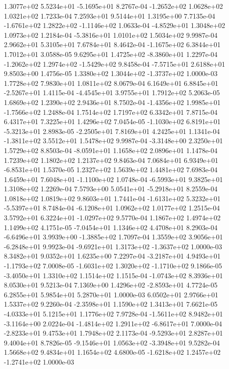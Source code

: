  1.3077e+02  5.5234e+01 -5.1695e+01  8.2767e-04
-1.2652e+02  1.0628e+02  1.0321e+02  1.7233e-04
7.2593e+01 9.5144e+01 1.3195e+00  7.7135e-04
-1.6761e+02  1.2822e+02 -1.1146e+02  1.0633e-04
-4.8529e+01  1.3048e+02  1.0973e+02  1.2184e-04
-5.3816e+01  1.0101e+02  1.5034e+02  9.9987e-04
2.9662e+01 5.3105e+01 7.6784e+01  8.4642e-04
-1.1675e+02  6.3844e+01  1.7012e+01  3.0588e-05
 9.6295e+01  1.4725e+02 -8.3860e+01  1.2297e-04
-1.2062e+02  1.2974e+02 -1.5429e+02  9.8458e-04
-7.5715e+01  2.6188e+01  9.8503e+00  1.4756e-05
 1.3380e+02  1.3044e+02 -1.3737e+02  1.0000e-03
1.7728e+02 7.9830e+01 1.0811e+02  8.0679e-04
 6.1649e+01  6.8845e+01 -2.5267e+01  1.4115e-04
-4.4545e+01  3.9755e+01  1.7912e+02  5.2063e-05
1.6869e+02 1.2390e+02 2.9436e+01  8.7502e-04
-1.4356e+02  1.9985e+01 -1.7566e+02  1.2488e-04
1.7514e+02 1.7197e+02 6.3342e+01  7.8715e-04
6.4317e+01 7.3225e+01 1.4296e+02  7.0454e-05
-1.1030e+02  6.8191e+01 -5.3213e+01  2.8983e-05
-2.2505e+01  7.8169e+01  4.2425e+01  1.1341e-04
-1.3811e+02  3.5512e+01  1.5478e+02  9.9987e-04
-3.3148e+00  2.3250e+01  1.5729e+02  8.8503e-04
-8.0591e+01  1.1658e+02  2.0896e+01  1.1478e-04
1.7239e+02 1.1802e+02 1.2137e+02  9.8463e-04
 7.0684e+01  6.9349e+01 -6.8531e+01  1.5370e-05
1.2327e+02 1.5639e+02 1.4481e+02  7.6983e-04
 1.6459e+01  7.6048e+01 -1.1100e+02  1.0748e-04
-6.5993e+01  9.3825e+01  1.3108e+02  1.2269e-04
 7.5793e+00  5.0541e+01 -5.2918e+01  8.2559e-04
1.0818e+02 1.0819e+02 9.8603e+01  1.7441e-04
-1.6131e+02  5.3232e+01 -5.5397e+01  8.7484e-04
-6.1208e+01  1.0962e+02  1.0177e+02  1.2515e-04
 3.5792e+01  6.3224e+01 -1.0297e+02  9.5770e-04
1.1867e+02 1.4974e+02 1.1499e+02  4.1751e-05
-7.0454e+01  1.1346e+02  4.4708e+01  8.2903e-04
-6.6496e+01  3.9939e+00 -1.3885e+02  1.7097e-04
 1.3559e+02  3.9056e+01 -6.2848e+01  9.9923e-04
-9.6921e+01  1.3173e+02 -1.3637e+02  1.0000e-03
8.3482e+01 9.0352e+01 1.6235e+00  7.2297e-04
-3.2187e+01  4.9493e+01 -1.1793e+02  7.0008e-05
-1.6031e+02  1.3020e+02 -1.1710e+02  9.1866e-05
-3.4050e+01  1.3310e+02  1.1514e+02  1.1515e-04
-1.0743e+02  8.3936e+01  8.0530e+01  9.5213e-04
 7.1369e+00  1.4296e+02 -2.8593e+01  4.7724e-05
6.2855e+01 5.9854e+01 5.2870e+01  1.0000e-03
6.0502e+01 2.9766e+01 1.5337e+02  9.2260e-04
-2.3598e+01  1.1590e+02  1.3413e+01  7.6621e-05
-4.0333e+01  5.1215e+01  1.1776e+02  7.9728e-04
-1.5611e+02  8.9482e+01 -3.1164e+00  2.0224e-04
-1.4814e+02  1.2911e+02 -6.8617e+01  7.0000e-04
-2.8233e+01  9.4753e+01  1.7948e+02  2.1173e-04
-9.5293e+01  2.8287e+01  9.4004e+01  8.7826e-05
-9.1546e+01  1.0563e+02 -3.3948e+01  9.5282e-04
1.5668e+02 9.4834e+01 1.1654e+02  4.6800e-05
-1.6218e+02  1.2457e+02 -1.2741e+02  1.0000e-03
